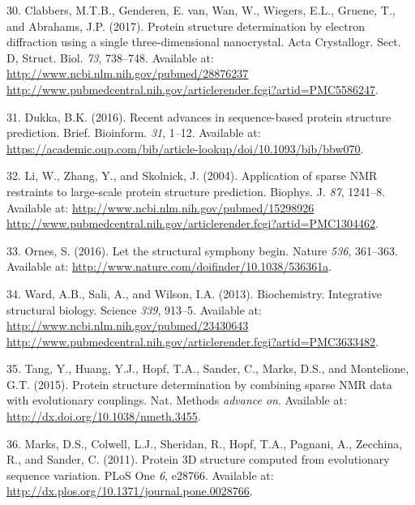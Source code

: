 \documentclass[11pt,a4paper,twoside]{book}
\theoremstyle{definition}
\theoremstyle{definition}
\theoremstyle{remark}
\begin{document}
\hypertarget{ref-Clabbers2017}{}
30. Clabbers, M.T.B., Genderen, E. van, Wan, W., Wiegers, E.L., Gruene,
T., and Abrahams, J.P. (2017). Protein structure determination by
electron diffraction using a single three-dimensional nanocrystal. Acta
Crystallogr. Sect. D, Struct. Biol. \emph{73}, 738--748. Available at:
\href{http://www.ncbi.nlm.nih.gov/pubmed/28876237\%20http://www.pubmedcentral.nih.gov/articlerender.fcgi?artid=PMC5586247}{http://www.ncbi.nlm.nih.gov/pubmed/28876237 http://www.pubmedcentral.nih.gov/articlerender.fcgi?artid=PMC5586247}.

\hypertarget{ref-BKC2016}{}
31. Dukka, B.K. (2016). Recent advances in sequence-based protein
structure prediction. Brief. Bioinform. \emph{31}, 1--12. Available at:
\url{https://academic.oup.com/bib/article-lookup/doi/10.1093/bib/bbw070}.

\hypertarget{ref-Li2004}{}
32. Li, W., Zhang, Y., and Skolnick, J. (2004). Application of sparse
NMR restraints to large-scale protein structure prediction. Biophys. J.
\emph{87}, 1241--8. Available at:
\href{http://www.ncbi.nlm.nih.gov/pubmed/15298926\%20http://www.pubmedcentral.nih.gov/articlerender.fcgi?artid=PMC1304462}{http://www.ncbi.nlm.nih.gov/pubmed/15298926 http://www.pubmedcentral.nih.gov/articlerender.fcgi?artid=PMC1304462}.

\hypertarget{ref-Ornes2016}{}
33. Ornes, S. (2016). Let the structural symphony begin. Nature
\emph{536}, 361--363. Available at:
\url{http://www.nature.com/doifinder/10.1038/536361a}.

\hypertarget{ref-Ward2013}{}
34. Ward, A.B., Sali, A., and Wilson, I.A. (2013). Biochemistry.
Integrative structural biology. Science \emph{339}, 913--5. Available
at:
\href{http://www.ncbi.nlm.nih.gov/pubmed/23430643\%20http://www.pubmedcentral.nih.gov/articlerender.fcgi?artid=PMC3633482}{http://www.ncbi.nlm.nih.gov/pubmed/23430643 http://www.pubmedcentral.nih.gov/articlerender.fcgi?artid=PMC3633482}.

\hypertarget{ref-Tang2015}{}
35. Tang, Y., Huang, Y.J., Hopf, T.A., Sander, C., Marks, D.S., and
Montelione, G.T. (2015). Protein structure determination by combining
sparse NMR data with evolutionary couplings. Nat. Methods \emph{advance
on}. Available at: \url{http://dx.doi.org/10.1038/nmeth.3455}.

\hypertarget{ref-Marks2011}{}
36. Marks, D.S., Colwell, L.J., Sheridan, R., Hopf, T.A., Pagnani, A.,
Zecchina, R., and Sander, C. (2011). Protein 3D structure computed from
evolutionary sequence variation. PLoS One \emph{6}, e28766. Available
at: \url{http://dx.plos.org/10.1371/journal.pone.0028766}.
\end{document}
